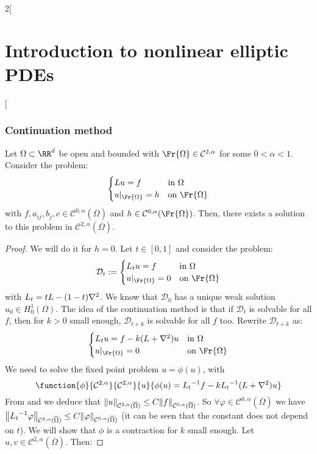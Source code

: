 \documentclass[../../../main_math.tex]{subfiles}
\begin{document}
\begin{multicols}{2}[\section{Introduction to nonlinear elliptic PDEs}]
  \subsubsection{Continuation method}
  \begin{theorem}
    Let $\Omega\subset\RR^d$ be open and bounded with $\Fr{\Omega}\in\mathcal{C}^{2,\alpha}$ for some $0<\alpha<1$. Consider the problem:
    $$
      \begin{cases}
        Lu=f               & \text{in }\Omega      \\
        u|_{\Fr{\Omega}}=h & \text{on }\Fr{\Omega}
      \end{cases}
    $$
    with $f,a_{ij},b_j,c\in\mathcal{C}^{0,\alpha}( \overline{\Omega})$ and $h\in\mathcal{C}^{0,\alpha}(\Fr{\Omega})$. Then, there exists a solution to this problem in $\mathcal{C}^{2,\alpha}(\overline{\Omega})$.
  \end{theorem}
  \begin{proof}
    We will do it for $h=0$.
    Let $t\in [0,1]$ and consider the problem:
    $$ \mathcal{D}_t:= \begin{cases}
        L_tu=f             & \text{in }\Omega      \\
        u|_{\Fr{\Omega}}=0 & \text{on }\Fr{\Omega}
      \end{cases}$$
    with $L_t=tL-(1-t)\laplacian$. We know that $\mathcal{D}_0$ has a unique weak solution $u_0\in H_0^1(\Omega)$. The idea of the continuation method is that if $\mathcal{D}_t$ is solvable for all $f$, then for $k>0$ small enough, $\mathcal{D}_{t+k}$ is solvable for all $f$ too. Rewrite $\mathcal{D}_{t+k}$ as:
    $$
      \begin{cases}
        L_{t}u=f-k(L+\laplacian)u & \text{in }\Omega      \\
        u|_{\Fr{\Omega}}=0        & \text{on }\Fr{\Omega}
      \end{cases}
    $$
    We need to solve the fixed point problem $u=\phi(u)$, with
    $$
      \function{\phi}{\mathcal{C}^{2,\alpha}}{\mathcal{C}^{2,\alpha}}{u}{\phi(u)={L_t}^{-1}f - k{L_t}^{-1}(L+\laplacian)u}
    $$
    From  and  we deduce that $\norm{u}_{\mathcal{C}^{2,\alpha}(\overline{\Omega})}\leq C\norm{f}_{\mathcal{C}^{0,\alpha}(\overline{\Omega})}$. So $\forall \varphi\in \mathcal{C}^{0,\alpha}(\overline{\Omega})$ we have $\norm{{L_t}^{-1}\varphi}_{\mathcal{C}^{2,\alpha}(\overline{\Omega})}\leq C\norm{\varphi}_{\mathcal{C}^{0,\alpha}(\overline{\Omega})}$ (it can be seen that the constant does not depend on $t$). We will show that $\phi$ is a contraction for $k$ small enough. Let $u,v\in \mathcal{C}^{2,\alpha}(\overline{\Omega})$. Then:

\end{proof}
\end{multicols}
\end{document}
